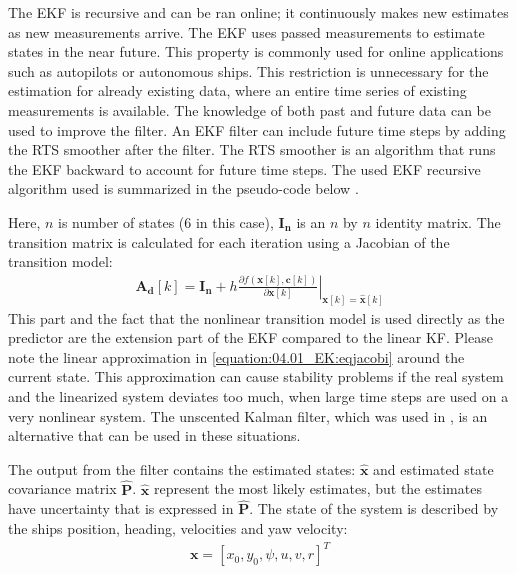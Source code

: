 The EKF is recursive and can be ran online; it continuously makes new estimates as new measurements arrive. The EKF uses passed measurements to estimate states in the near future. This property is commonly used for online applications such as autopilots or autonomous ships. This restriction is unnecessary for the estimation for already existing data, where an entire time series of existing measurements is available. The knowledge of both past and future data can be used to improve the filter. An EKF filter can include future time steps by adding the RTS smoother after the filter. The RTS smoother is an algorithm that runs the EKF backward to account for future time steps. The used EKF recursive algorithm used is summarized in the pseudo-code below \cite{brownIntroductionRandomSignals1997}.
\clearpage

Here, \(n\) is number of states (6 in this case), \(\mathbf{I_n}\) is an $n$ by $n$ identity matrix.
The transition matrix is calculated for each iteration using a Jacobian of the transition model:
\begin{equation}\label{equation:04.01_EK:eqjacobi}
\begin{split}\mathbf{A_d}[k] = \mathbf{I_n} + h \left. \frac{\partial f \left(\mathbf{x}[k],\mathbf{c}[k] \right)}{\partial \mathbf{x}[k]} \right|_{\mathbf{x}[k]=\mathbf{\hat{x}}[k]}\end{split}
\end{equation}
This part and the fact that the nonlinear transition model is used directly as the predictor are the extension part of the EKF compared to the linear KF. Please note the linear approximation in \autoref{equation:04.01_EK:eqjacobi} around the current state. This approximation can cause stability problems if the real system and the linearized system deviates too much, when large time steps are used on a very nonlinear system. The unscented Kalman filter, which was used in \textcite{revestidoherreroTwostepIdentificationNonlinear2012}, is an alternative that can be used in these situations.

The output from the filter contains the estimated states: \(\mathbf{\hat{x}}\) and estimated state covariance matrix \(\mathbf{\hat{P}}\). \(\mathbf{\hat{x}}\) represent the most likely estimates, but the estimates have uncertainty that is expressed in \(\mathbf{\hat{P}}\).
The state of the system is described by the ships position, heading, velocities and yaw velocity:
\begin{equation}\label{equation:04.01_EK:eqstates}
\begin{split}\mathbf{x} = [x_0,y_0,\psi,u,v,r]^T\end{split}
\end{equation}

